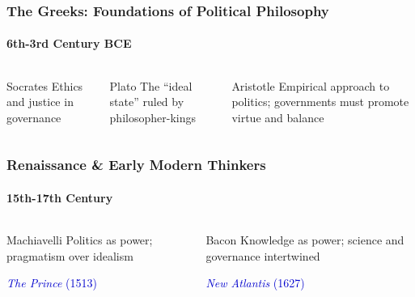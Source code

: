 \documentclass[10pt]{beamer}
\begin{document}
\begin{frame}
\frametitle{The Greeks: Foundations of Political Philosophy}
\framesubtitle{6th-3rd Century BCE}

\begin{columns}
\begin{column}{0.32\textwidth}
\begin{block}{Socrates}
\pause
Ethics and justice in governance
\end{block}
\end{column}

\begin{column}{0.32\textwidth}
\begin{block}{Plato}
\pause
The ``ideal state'' ruled by philosopher-kings
\end{block}
\end{column}

\begin{column}{0.32\textwidth}
\begin{block}{Aristotle}
\pause
Empirical approach to politics; governments must promote virtue and balance
\end{block}
\end{column}
\end{columns}

\end{frame}

\begin{frame}
\frametitle{Renaissance \& Early Modern Thinkers}
\framesubtitle{15th-17th Century}

\begin{columns}
\begin{column}{0.48\textwidth}
\begin{block}{Machiavelli}
\pause
Politics as power; pragmatism over idealism

\vspace{0.3cm}
\textcolor{mediumblue}{\textit{The Prince} (1513)}
\end{block}
\end{column}

\begin{column}{0.48\textwidth}
\begin{block}{Bacon}
\pause
Knowledge as power; science and governance intertwined

\vspace{0.3cm}
\textcolor{mediumblue}{\textit{New Atlantis} (1627)}
\end{block}
\end{column}
\end{columns}

\end{frame}
\end{document}
